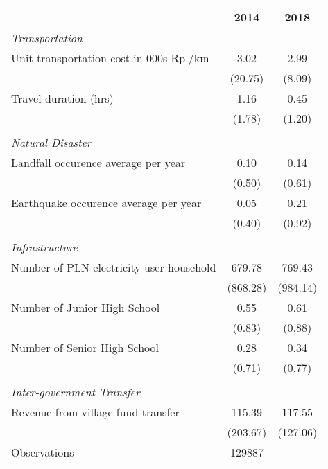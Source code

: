 \begin{tabular}{l*{2}{c}}
\hline\hline
                    &        2014&        2018\\
\hline
\emph{Transportation}&            &            \\
\hspace{0.25cm} Unit transportation cost in 000s Rp./km&        3.02&        2.99\\
                    &     (20.75)&      (8.09)\\
\hspace{0.25cm} Travel duration (hrs)&        1.16&        0.45\\
                    &      (1.78)&      (1.20)\\
\vspace{0.05em} \\ \emph{Natural Disaster}&            &            \\
\hspace{0.25cm} Landfall occurence average per year&        0.10&        0.14\\
                    &      (0.50)&      (0.61)\\
\hspace{0.25cm} Earthquake occurence average per year&        0.05&        0.21\\
                    &      (0.40)&      (0.92)\\
\vspace{0.05em} \\ \emph{Infrastructure}&            &            \\
\hspace{0.25cm} Number of PLN electricity user household&      679.78&      769.43\\
                    &    (868.28)&    (984.14)\\
\hspace{0.25cm} Number of Junior High School&        0.55&        0.61\\
                    &      (0.83)&      (0.88)\\
\hspace{0.25cm} Number of Senior High School&        0.28&        0.34\\
                    &      (0.71)&      (0.77)\\
\vspace{0.05em} \\ \emph{Inter-government Transfer}&            &            \\
\hspace{0.25cm} Revenue from village fund transfer&      115.39&      117.55\\
                    &    (203.67)&    (127.06)\\
\hline
Observations        &      129887&            \\
\hline\hline
\end{tabular}
